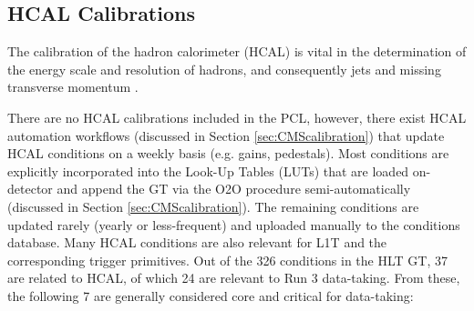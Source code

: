 \subsection{HCAL Calibrations}

The calibration of the hadron calorimeter (HCAL) is vital in the determination of the energy scale and resolution of hadrons, and consequently jets and missing transverse momentum \cite{CMS-PRF-18-001}.

There are no HCAL calibrations included in the PCL, however, there exist HCAL automation workflows (discussed in Section \ref{sec:CMScalibration}) that update HCAL conditions on a weekly basis (e.g. gains, pedestals). Most conditions are explicitly incorporated into the Look-Up Tables (LUTs) that are loaded on-detector and append the GT via the O2O procedure semi-automatically (discussed in Section \ref{sec:CMScalibration}). The remaining conditions are updated rarely (yearly or less-frequent) and uploaded manually to the conditions database. Many HCAL conditions are also relevant for L1T and the corresponding trigger primitives. Out of the 326 conditions in the HLT GT, 37 are related to HCAL, of which 24 are relevant to Run 3 data-taking. From these, the following 7 are generally considered core and critical for data-taking:

